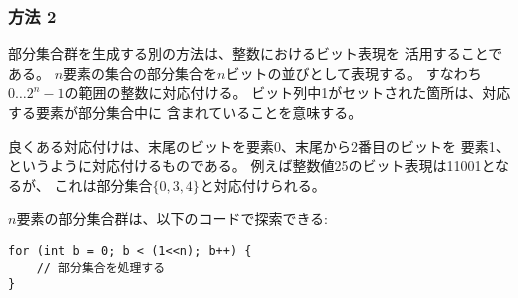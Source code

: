 \begin{comment}
\subsubsection{Method 2}

Another way to generate subsets is based on
the bit representation of integers.
Each subset of a set of $n$ elements
can be represented as a sequence of $n$ bits,
which corresponds to an integer between $0 \ldots 2^n-1$.
The ones in the bit sequence indicate
which elements are included in the subset.

The usual convention is that
the last bit corresponds to element 0,
the second last bit corresponds to element 1,
and so on.
For example, the bit representation of 25
is 11001, which corresponds to the subset $\{0,3,4\}$.
\end{comment}

\subsubsection{方法 2}

部分集合群を生成する別の方法は、整数におけるビット表現を
活用することである。
$n$要素の集合の部分集合を$n$ビットの並びとして表現する。
すなわち$0 \ldots 2^n-1$の範囲の整数に対応付ける。
ビット列中1がセットされた箇所は、対応する要素が部分集合中に
含まれていることを意味する。

良くある対応付けは、末尾のビットを要素0、末尾から2番目のビットを
要素1、というように対応付けるものである。
例えば整数値25のビット表現は11001となるが、
これは部分集合$\{0,3,4\}$と対応付けられる。

\begin{comment}
The following code goes through the subsets
of a set of $n$ elements

\begin{lstlisting}
for (int b = 0; b < (1<<n); b++) {
    // process subset
}
\end{lstlisting}

The following code shows how we can find
the elements of a subset that corresponds to a bit sequence.
When processing each subset,
the code builds a vector that contains the
elements in the subset.
\end{comment}

$n$要素の部分集合群は、以下のコードで探索できる:

\begin{lstlisting}
for (int b = 0; b < (1<<n); b++) {
    // 部分集合を処理する
}
\end{lstlisting}

